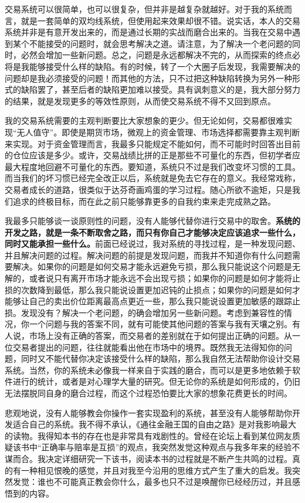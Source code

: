 交易系统可以很简单，也可以很复杂，但并非是越复杂就越好。对于我的系统而言，就是一套简单的双均线系统，但使用起来效果却很不错。说实话，本人的交易系统并非是有意开发出来的，而是通过长期的实战而磨合出来的。当我在交易中遇到某个不能接受的问题时，就会思考解决之道。请注意，为了解决一个老问题的同时，必然会增加一些新问题。总之，问题是永远都解决不完的，从而探索的终点必将是我能够接受什么样的缺陷。有的时候，转了一个大圈子后发现，我需要解决的问题却是我必须接受的问题！而其他的方法，只不过把这种缺陷转换为另外一种形式的缺陷罢了，甚至后者的缺陷更加难以接受。具有讽刺意义的是，我大部分努力的结果，就是发现更多的等效性原则，从而使交易系统不得不又回到原点。

我的交易系统需要的主观判断要比大家想象的更少。但无论如何，交易都很难实现“无人值守”。即使是期货市场，微观上的资金管理、市场选择都需要靠主观判断来实现。对于资金管理而言，我最多只能规定不能如何，而不可能时时回答出目前的仓位应该是多少。或许，交易战绩比拼的正是那些不可量化的东西，但初学者应最大程度地回避不可量化的东西。要知道，系统只不过是我们改变坏习惯的工具。而当我们的坏习惯已经完全改正以后，系统就是免去它存在的意义。我经常戏称，交易者成长的道路，很类似于达芬奇画鸡蛋的学习过程。随心所欲不逾矩，只是我们追求的终极目标，而在此之前只能够靠更多的自我约束来走完成熟之路。

我最多只能够谈一谈原则性的问题，没有人能够代替你进行交易中的取舍。\textbf{系统的开发之路，就是一条不断取舍之路，而只有你自己才能够决定应该追求一些什么，同时又能承担一些什么。}前面已经说过，我对系统的寻找过程，是一种发现问题、并且解决问题的过程。解决问题的前提是发现问题，而我并不知道你有什么问题需要解决。如果你的问题是如何交易才能永远避免亏损，那么我只能说这个问题是无解的，或者说只有离开市场才能永远不会出现亏损；如果你的问题是如何才能将止损的次数降到最低，那么我只能说设置更加迟钝的止损点；如果你的问题是如何才能够让自己的卖出价位距离最高点更近一些，那么我只能说设置更加敏感的跟踪止损。发现没有？解决一个老问题，的确会增加另一些新问题。考虑到兼容性的情况，你一个问题与我的答案不同，就有可能使其他问题的答案与我有天壤之别。有人说，市场上没有正确的答案，而交易者的差别就在于如何提出正确的问题。从一位交易者提出的问题，往往就能看出他在市场中的境界。既然我无法得知你的问题，同时又不能代替你决定该接受什么样的缺陷，那么我自然无法帮助你设计交易系统。当然，你的系统未必像我一样来自于实践的磨合，而可以是更多地依赖于软件进行的统计，或者是对心理学大量的研究。但无论你的系统是如何形成的，仍旧无法摆脱同自身的磨合过程，而这个过程恐怕要比大家的想象花费更长的时间。

悲观地说，没有人能够教会你操作一套实现盈利的系统，甚至没有人能够帮助你开发适合自己的系统。我不得不承认，《通往金融王国的自由之路》是对我影响最大的读物。我得知本书的存在也是非常具有戏剧性的。曾经在论坛上看到某位网友质疑该书中“正确率与赔率是互损”的观点，我突然发觉这种观点与我多年来的经验不谋而合。我决定详细研究一下该书，阅读本书的过程就是不断产生共鸣的过程。真的有一种相见恨晚的感觉，并且对我至今沿用的思维方式产生了重大的启发。我突然发觉：谁也不可能真正教会你什么，最多也只不过是唤醒你已经经历过，并且感悟到的内容。

